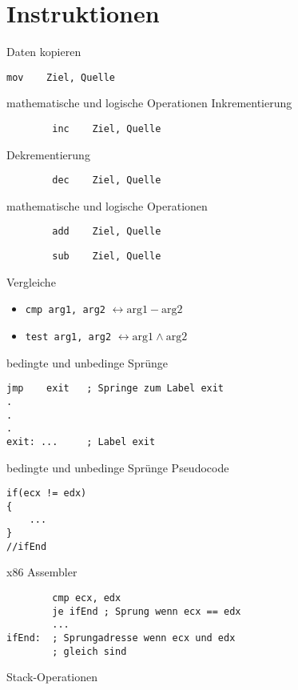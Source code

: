 \section{Instruktionen}

\begin{frame}[fragile]{Daten kopieren}
\begin{lstlisting}
mov    Ziel, Quelle
\end{lstlisting}
\end{frame}

\begin{frame}[fragile]{mathematische und logische Operationen}
	Inkrementierung
		\begin{lstlisting}
		inc    Ziel, Quelle
		\end{lstlisting}

	Dekrementierung
		\begin{lstlisting}
		dec    Ziel, Quelle
		\end{lstlisting}
\end{frame}

\begin{frame}[fragile]{mathematische und logische Operationen}
		\begin{lstlisting}
		add    Ziel, Quelle
		\end{lstlisting}

		\begin{lstlisting}
		sub    Ziel, Quelle
		\end{lstlisting}
\end{frame}

\begin{frame}{Vergleiche}
\begin{itemize}
	\item \texttt{cmp arg1, arg2} $\leftrightarrow \text{arg1} - \text{arg2}$

	\item \texttt{test arg1, arg2} $\leftrightarrow \text{arg1} \wedge \text{arg2}$
\end{itemize}
\end{frame}

\begin{frame}[fragile]{bedingte und unbedinge Sprünge}
\begin{lstlisting}
jmp    exit   ; Springe zum Label exit
.
.
.
exit: ...     ; Label exit
\end{lstlisting}
\end{frame}

\begin{frame}[fragile]{bedingte und unbedinge Sprünge}
Pseudocode
\begin{lstlisting}
if(ecx != edx)
{
	...
}
//ifEnd
\end{lstlisting}

x86 Assembler
\begin{lstlisting}
        cmp ecx, edx
        je ifEnd ; Sprung wenn ecx == edx
        ...
ifEnd:  ; Sprungadresse wenn ecx und edx
        ; gleich sind 
\end{lstlisting}
\end{frame}

\begin{frame}{Stack-Operationen}
\end{frame}
